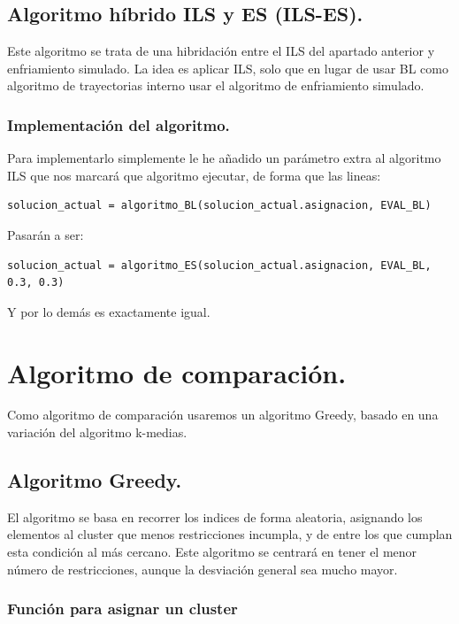 \documentclass[12pt, spanish]{article}
\begin{document}
\subsection{Algoritmo híbrido ILS y ES (ILS-ES).}

Este algoritmo se trata de una hibridación entre el ILS del apartado anterior y enfriamiento simulado. La idea es aplicar ILS, solo que en lugar de usar BL como algoritmo de trayectorias interno usar el algoritmo de enfriamiento simulado.

\subsubsection{Implementación del algoritmo.}

Para implementarlo simplemente le he añadido un parámetro extra al algoritmo ILS que nos marcará que algoritmo ejecutar, de forma que las lineas:

\begin{lstlisting}
solucion_actual = algoritmo_BL(solucion_actual.asignacion, EVAL_BL)
\end{lstlisting}

Pasarán a ser:

\begin{lstlisting}
solucion_actual = algoritmo_ES(solucion_actual.asignacion, EVAL_BL, 0.3, 0.3)
\end{lstlisting}

Y por lo demás es exactamente igual.

\section{Algoritmo de comparación.}

Como algoritmo de comparación usaremos un algoritmo Greedy, basado en una variación del algoritmo k-medias.

\subsection{Algoritmo Greedy.}

El algoritmo se basa en recorrer los indices de forma aleatoria, asignando los elementos al cluster que menos restricciones incumpla, y de entre los que cumplan esta condición al más cercano. Este algoritmo se centrará en tener el menor número de restricciones, aunque la desviación general sea mucho mayor.

\subsubsection{Función para asignar un cluster}
\end{document}
